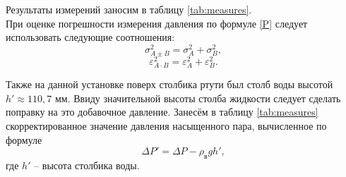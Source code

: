 \documentclass[a4paper, 12pt]{article}
\begin{document}
    \noindent Результаты измерений заносим в таблицу \ref{tab:measures}. \\

    \noindent При оценке погрешности измерения давления по формуле \eqref{P} следует использовать следующие соотношения:
    \[ \sigma^2_{A\pm B} = \sigma^2_A+\sigma^2_B, \]
    \[ \varepsilon^2_{A\cdot B} = \varepsilon^2_A+\varepsilon^2_B. \]

    \noindent Также на данной установке поверх столбика ртути был столб воды высотой $h' \approx 110,7$ мм. Ввиду значительной высоты столба жидкости следует сделать поправку на это добавочное давление. Занесём в таблицу \ref{tab:measures} скорректированное значение давления насыщенного пара, вычисленное по формуле \[ \Delta P' = \Delta P - \rho_\text{в}gh', \] где $h'$ -- высота столбика воды.
\end{document}

